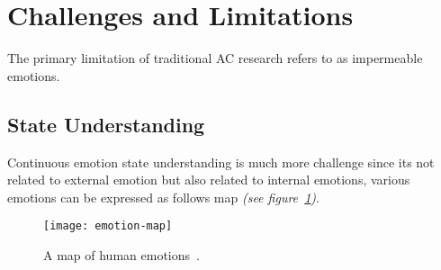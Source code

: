\section{Challenges and Limitations}\label{sec:challenges}

The primary limitation of traditional AC research refers to as impermeable emotions.

\cite{Picard2003}

\subsection{State Understanding}

Continuous emotion state understanding is much more challenge since its not related to external emotion but also related to internal emotions, various emotions can be expressed as follows map \textit{(see figure~\ref{fig:emotions})}.

\begin{figure}[htb]
    \centering
    \texttt{[image: emotion-map]}
    \caption{A map of human emotions~\cite{emotionmap}.}
    \label{fig:emotions}
\end{figure}